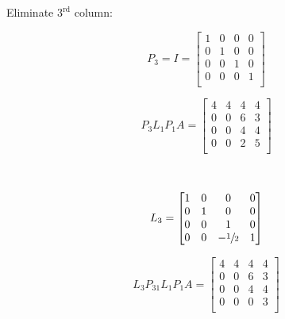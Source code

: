\documentclass[12pt]{article}
\begin{document}
Eliminate $3^\text{rd}$ column:\\
\begin{minipage}[t]{0.5\textwidth}
    $$
        P_3 = I =
        \begin{bmatrix}
            1 & 0 & 0 & 0 \\
            0 & 1 & 0 & 0 \\
            0 & 0 & 1 & 0 \\
            0 & 0 & 0 & 1 \\
        \end{bmatrix}
    $$
\end{minipage}
\begin{minipage}[t]{0.5\textwidth}
    $$
        P_3L_1P_1A =
        \begin{bmatrix}
            4 & 4 & 4 & 4 \\
            0 & 0 & 6 & 3 \\
            0 & 0 & 4 & 4 \\
            0 & 0 & 2 & 5 \\
        \end{bmatrix}
    $$
\end{minipage}\\
\begin{minipage}[t]{0.5\textwidth}
    $$
        L_3 =
        \begin{bmatrix}
            1 & 0 & 0             & 0 \\
            0 & 1 & 0             & 0 \\
            0 & 0 & 1             & 0 \\
            0 & 0 & -\sfrac{1}{2} & 1 \\
        \end{bmatrix}
    $$
\end{minipage}
\begin{minipage}[t]{0.5\textwidth}
    $$
        L_3P_31L_1P_1A =
        \begin{bmatrix}
            4 & 4 & 4 & 4 \\
            0 & 0 & 6 & 3 \\
            0 & 0 & 4 & 4 \\
            0 & 0 & 0 & 3 \\
        \end{bmatrix}
    $$
\end{minipage}
\end{document}
